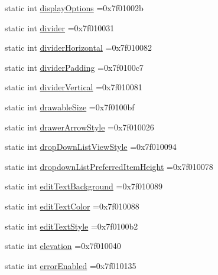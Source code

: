 \begin{DoxyCompactItemize}
\item 
static int \hyperlink{classandroid_1_1support_1_1design_1_1R_1_1attr_a17a2e287c786fb6fbf1e77f6b90877c7}{display\+Options} =0x7f01002b
\item 
static int \hyperlink{classandroid_1_1support_1_1design_1_1R_1_1attr_aaec83d2f909bf7da00e50359ec0806ac}{divider} =0x7f010031
\item 
static int \hyperlink{classandroid_1_1support_1_1design_1_1R_1_1attr_a9109377b1757939e39799dd20017a3fd}{divider\+Horizontal} =0x7f010082
\item 
static int \hyperlink{classandroid_1_1support_1_1design_1_1R_1_1attr_a344833a38d52ba02220b6702dbb39081}{divider\+Padding} =0x7f0100c7
\item 
static int \hyperlink{classandroid_1_1support_1_1design_1_1R_1_1attr_a994f6b92e9866888f5c764eedab456f9}{divider\+Vertical} =0x7f010081
\item 
static int \hyperlink{classandroid_1_1support_1_1design_1_1R_1_1attr_a74f0ef8703109da7b9564fb1dd4c2a70}{drawable\+Size} =0x7f0100bf
\item 
static int \hyperlink{classandroid_1_1support_1_1design_1_1R_1_1attr_a231b64d73bc7eaef60a4297f2eb9d434}{drawer\+Arrow\+Style} =0x7f010026
\item 
static int \hyperlink{classandroid_1_1support_1_1design_1_1R_1_1attr_ae3bfc4373a4b49924e4173313505b015}{drop\+Down\+List\+View\+Style} =0x7f010094
\item 
static int \hyperlink{classandroid_1_1support_1_1design_1_1R_1_1attr_ae39cdea84f2a4492abd1e1e9e4415cf1}{dropdown\+List\+Preferred\+Item\+Height} =0x7f010078
\item 
static int \hyperlink{classandroid_1_1support_1_1design_1_1R_1_1attr_a49b2c6643751648743fe12e507b2f5e8}{edit\+Text\+Background} =0x7f010089
\item 
static int \hyperlink{classandroid_1_1support_1_1design_1_1R_1_1attr_a7a57b92b07f0f87e82599b0e12477273}{edit\+Text\+Color} =0x7f010088
\item 
static int \hyperlink{classandroid_1_1support_1_1design_1_1R_1_1attr_a96bb8f72045bd97b7c4de5d060456b84}{edit\+Text\+Style} =0x7f0100b2
\item 
static int \hyperlink{classandroid_1_1support_1_1design_1_1R_1_1attr_a5089b576eabe15b5d530b536c68a760d}{elevation} =0x7f010040
\item 
static int \hyperlink{classandroid_1_1support_1_1design_1_1R_1_1attr_a5430c3e8b84d5e2125c6abe6790c3ce6}{error\+Enabled} =0x7f010135
\item 

\end{DoxyCompactItemize}
